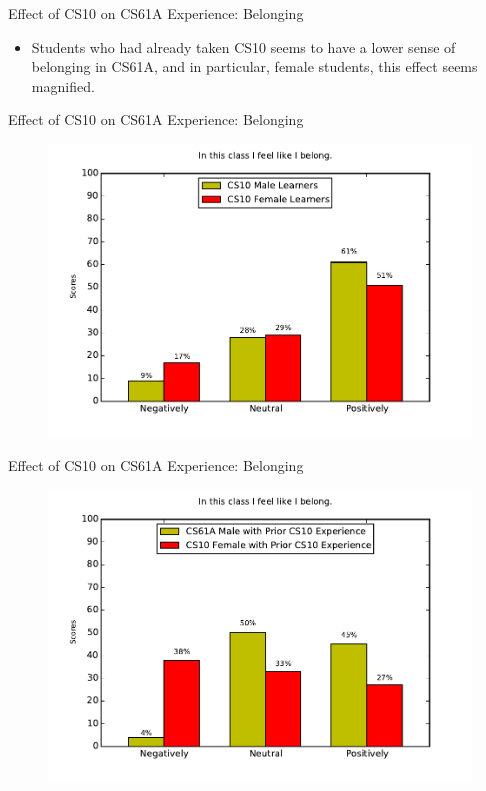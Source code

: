 \documentclass{beamer}                  %
\begin{document}
\begin{frame}{Effect of CS10 on CS61A Experience: Belonging}
  \begin{itemize}
  \item Students who had already taken CS10 seems to have a lower sense of belonging in CS61A, and in particular, female students, this effect seems magnified.
  \end{itemize}
\end{frame}
    
\begin{frame}{Effect of CS10 on CS61A Experience: Belonging}

  \begin{figure}[!htbp]
      \centering 
      \includegraphics[width=1\textwidth]{blg_1_worstCaseScenario_cs10}
  \end{figure}

\end{frame}

\begin{frame}{Effect of CS10 on CS61A Experience: Belonging}

  \begin{figure}[!htbp]
      \centering 
      \includegraphics[width=1\textwidth]{blg_1_worstCaseScenario}
  \end{figure}

\end{frame}
\end{document}
